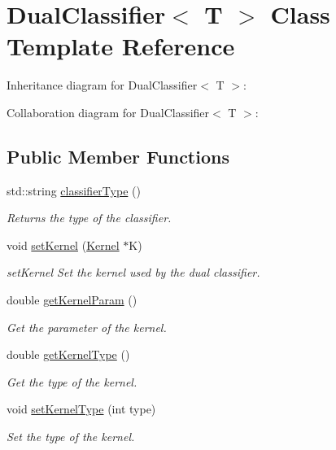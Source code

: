 \hypertarget{class_dual_classifier}{}\section{Dual\+Classifier$<$ T $>$ Class Template Reference}
\label{class_dual_classifier}


Inheritance diagram for Dual\+Classifier$<$ T $>$\+:


Collaboration diagram for Dual\+Classifier$<$ T $>$\+:
\subsection*{Public Member Functions}
\begin{DoxyCompactItemize}
\item 
std\+::string \mbox{\hyperlink{class_dual_classifier_af1217d4b44e417817a25157bb3f9b6d9}{classifier\+Type}} ()
\begin{DoxyCompactList}\small\item\em Returns the type of the classifier. \end{DoxyCompactList}\item 
void \mbox{\hyperlink{class_dual_classifier_a4f4cc830f9f9723592dc92957aec5d48}{set\+Kernel}} (\mbox{\hyperlink{class_kernel}{Kernel}} $\ast$K)
\begin{DoxyCompactList}\small\item\em set\+Kernel Set the kernel used by the dual classifier. \end{DoxyCompactList}\item 
double \mbox{\hyperlink{class_dual_classifier_ad5cc383587a3388bfc370879d76b8cf6}{get\+Kernel\+Param}} ()
\begin{DoxyCompactList}\small\item\em Get the parameter of the kernel. \end{DoxyCompactList}\item 
double \mbox{\hyperlink{class_dual_classifier_ae15bdcaa9b46e1084aa2df7170a0217f}{get\+Kernel\+Type}} ()
\begin{DoxyCompactList}\small\item\em Get the type of the kernel. \end{DoxyCompactList}\item 
void \mbox{\hyperlink{class_dual_classifier_abe138aa8f388a11475773155961911be}{set\+Kernel\+Type}} (int type)
\begin{DoxyCompactList}\small\item\em Set the type of the kernel. \end{DoxyCompactList}\item 

\end{DoxyCompactItemize}

